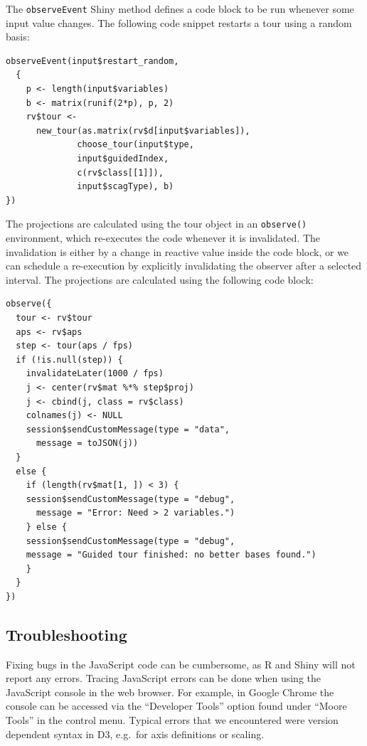 The \texttt{observeEvent} Shiny method defines a code block to be run
whenever some input value changes. The following code snippet restarts a
tour using a random basis:

\begin{verbatim}
observeEvent(input$restart_random,
  {
    p <- length(input$variables)
    b <- matrix(runif(2*p), p, 2)
    rv$tour <- 
      new_tour(as.matrix(rv$d[input$variables]),
              choose_tour(input$type, 
              input$guidedIndex,
              c(rv$class[[1]]), 
              input$scagType), b)
})
\end{verbatim}

The projections are calculated using the tour object in an
\texttt{observe()} environment, which re-executes the code whenever it
is invalidated. The invalidation is either by a change in reactive value
inside the code block, or we can schedule a re-execution by explicitly
invalidating the observer after a selected interval. The projections are
calculated using the following code block:

\begin{verbatim}
observe({
  tour <- rv$tour
  aps <- rv$aps
  step <- tour(aps / fps)
  if (!is.null(step)) {
    invalidateLater(1000 / fps)
    j <- center(rv$mat %*% step$proj)
    j <- cbind(j, class = rv$class)
    colnames(j) <- NULL
    session$sendCustomMessage(type = "data", 
      message = toJSON(j))
  }
  else {
    if (length(rv$mat[1, ]) < 3) {
    session$sendCustomMessage(type = "debug", 
      message = "Error: Need > 2 variables.")
    } else {
    session$sendCustomMessage(type = "debug", 
    message = "Guided tour finished: no better bases found.")
    }
  }
})
\end{verbatim}

\hypertarget{troubleshooting}{%
\subsection{Troubleshooting}\label{troubleshooting}}

Fixing bugs in the JavaScript code can be cumbersome, as R and Shiny
will not report any errors. Tracing JavaScript errors can be done when
using the JavaScript console in the web browser. For example, in Google
Chrome the console can be accessed via the ``Developer Tools'' option
found under ``Moore Tools'' in the control menu. Typical errors that we
encountered were version dependent syntax in D3, e.g.~for axis
definitions or scaling.

